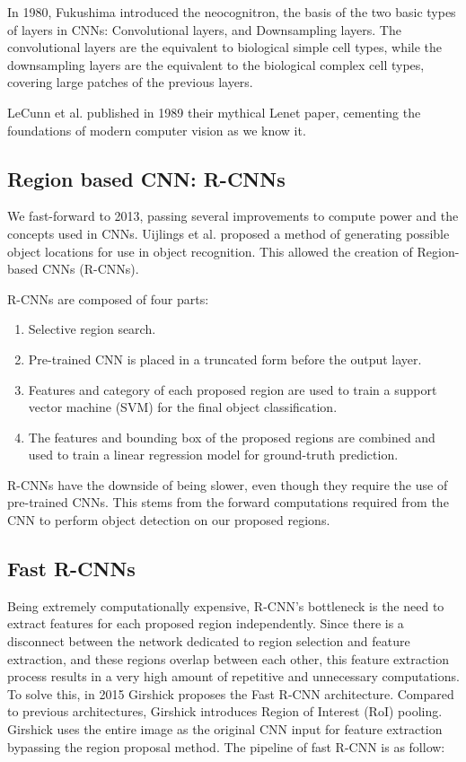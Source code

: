 \documentclass[10pt,a4paper,twocolumn,twoside]{article}
\begin{document}
In 1980, Fukushima\cite{fukushima_1980} introduced the neocognitron, the basis of the two basic types of layers in CNNs: Convolutional layers, and Downsampling layers. The convolutional layers are the equivalent to biological simple cell types, while the downsampling layers are the equivalent to the biological complex cell types, covering large patches of the previous layers. 

LeCunn et al. published in 1989\cite{LeCunn} their mythical Lenet paper, cementing the foundations of modern computer vision as we know it.

\subsection{Region based CNN: R-CNNs}
We fast-forward to 2013, passing several improvements to compute power and the concepts used in CNNs. Uijlings et al.\cite{uijlings_van} proposed a method of generating possible object locations for use in object recognition. This allowed the creation of Region-based CNNs (R-CNNs). 

R-CNNs are composed of four parts:
\begin{enumerate}
    \item Selective region search.
    \item Pre-trained CNN is placed in a truncated form before the output layer.
    \item Features and category of each proposed region are used to train a support vector machine (SVM) for the final object classification.
    \item The features and bounding box of the proposed regions are combined and used to train a linear regression model for ground-truth prediction.
\end{enumerate}

R-CNNs have the downside of being slower, even though they require the use of pre-trained CNNs. This stems from the forward computations required from the CNN to perform object detection on our proposed regions. 

\subsection{Fast R-CNNs}

Being extremely computationally expensive, R-CNN's bottleneck is the need to extract features for each proposed region independently. Since there is a disconnect between the network dedicated to region selection and feature extraction, and these regions overlap between each other, this feature extraction process results in a very high amount of repetitive and unnecessary computations. To solve this, in 2015  Girshick\cite{girshick_2015} proposes the Fast R-CNN architecture. 
Compared to previous architectures, Girshick introduces Region of Interest (RoI) pooling. Girshick uses the entire image as the original CNN input for feature extraction bypassing the region proposal method. The pipeline of fast R-CNN is as follow:
\end{document}
